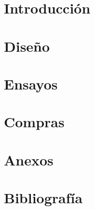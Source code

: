 \documentclass[12pt,oneside,final]{rf2}
\begin{document}





\newpage
{}

\tableofcontents

\listoffigures

\listoftables
\newpage
\startarabicpagination

\part{Introducción}


\part{Diseño}




\part{Ensayos}

\part{Compras}




\part{Anexos}
\appendix
%

\part{Bibliografía}
%
%
\end{document}
